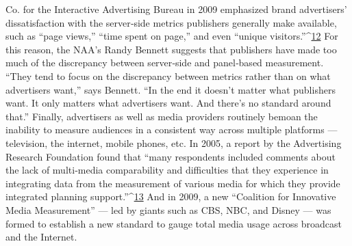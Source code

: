 Co. for the Interactive Advertising Bureau in 2009 emphasized brand
advertisers’ dissatisfaction with the server‐side metrics publishers
generally make available, such as ``page views,'' ``time spent on page,''
and even ``unique visitors.''^{\href{#endnotes}{12}}
For this reason, the NAA’s Randy Bennett suggests that publishers have
made too much of the discrepancy between server‐side and panel‐based
measurement. ``They tend to focus on the discrepancy between metrics
rather than on what advertisers want,'' says Bennett. ``In the end it doesn’t
matter what publishers want. It only matters what advertisers want. And
there’s no standard around that.''
Finally, advertisers as well as media providers routinely bemoan the
inability to measure audiences in a consistent way across multiple
platforms — television, the internet, mobile phones, etc. In 2005, a report
by the Advertising Research Foundation found that ``many respondents
included comments about the lack of multi‐media comparability and
difficulties that they experience in integrating data from the measurement
of various media for which they provide integrated planning support.''^{\href{#endnotes}{13}}
And in 2009, a new ``Coalition for Innovative Media Measurement'' — led
by giants such as CBS, NBC, and Disney — was formed to establish a new
standard to gauge total media usage across broadcast and the Internet.

